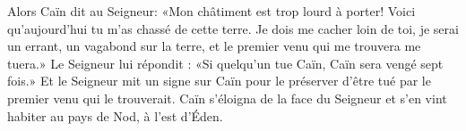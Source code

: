 Alors Caïn dit au Seigneur: «Mon châtiment est trop lourd à porter!
	Voici qu’aujourd’hui tu m’as chassé de cette terre.
	Je dois me cacher loin de toi, je serai un errant,
	un vagabond sur la terre, et le premier venu qui me trouvera me tuera.»
Le Seigneur lui répondit :
	«Si quelqu’un tue Caïn, Caïn sera vengé sept fois.»
Et le Seigneur mit un signe sur Caïn
	pour le préserver d’être tué par le premier venu qui le trouverait.
Caïn s’éloigna de la face du Seigneur
	et s’en vint habiter au pays de Nod, à l’est d’Éden.

